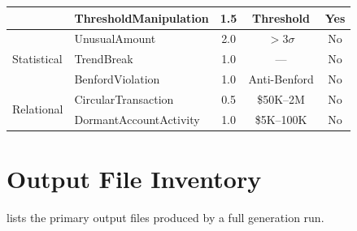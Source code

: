 \begin{table}[H]
\begin{tabular}{llccc}
  & ThresholdManipulation        & 1.5 & Threshold   & Yes \\
\midrule
\multirow{3}{*}{Statistical}
  & UnusualAmount                & 2.0 & $>3\sigma$  & No \\
  & TrendBreak                   & 1.0 & ---         & No \\
  & BenfordViolation             & 1.0 & Anti-Benford & No \\
\midrule
\multirow{2}{*}{Relational}
  & CircularTransaction          & 0.5 & \$50K--2M   & No \\
  & DormantAccountActivity       & 1.0 & \$5K--100K  & No \\
\bottomrule
\end{tabular}
\end{table}

\section{Output File Inventory}
\label{app:output_files}

 lists the primary output files produced by
a full \system{} generation run.

